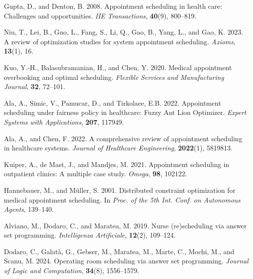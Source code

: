 \documentclass{tlp}
\begin{document}
\begin{thebibliography}{}

Gupta, D., and Denton, B. 2008.
Appointment scheduling in health care: Challenges and opportunities.
\textit{IIE Transactions}, \textbf{40}(9), 800--819.

Niu, T., Lei, B., Guo, L., Fang, S., Li, Q., Gao, B., Yang, L., and Gao, K. 2023.
A review of optimization studies for system appointment scheduling.
\textit{Axioms}, \textbf{13}(1), 16.

Kuo, Y.-H., Balasubramanian, H., and Chen, Y. 2020.
Medical appointment overbooking and optimal scheduling.
\textit{Flexible Services and Manufacturing Journal}, \textbf{32}, 72--101.

Ala, A., Simic, V., Pamucar, D., and Tirkolaee, E.B. 2022.
Appointment scheduling under fairness policy in healthcare: Fuzzy Ant Lion Optimizer.
\textit{Expert Systems with Applications}, \textbf{207}, 117949.

Ala, A., and Chen, F. 2022.
A comprehensive review of appointment scheduling in healthcare systems.
\textit{Journal of Healthcare Engineering}, \textbf{2022}(1), 5819813.

Kuiper, A., de Mast, J., and Mandjes, M. 2021.
Appointment scheduling in outpatient clinics: A multiple case study.
\textit{Omega}, \textbf{98}, 102122.

Hannebauer, M., and Müller, S. 2001.
Distributed constraint optimization for medical appointment scheduling.
In \textit{Proc. of the 5th Int. Conf. on Autonomous Agents}, 139--140.

Alviano, M., Dodaro, C., and Maratea, M. 2019.
Nurse (re)scheduling via answer set programming.
\textit{Intelligenza Artificiale}, \textbf{12}(2), 109--124.

Dodaro, C., Galatà, G., Gebser, M., Maratea, M., Marte, C., Mochi, M., and Scanu, M. 2024.
Operating room scheduling via answer set programming.
\textit{Journal of Logic and Computation}, \textbf{34}(8), 1556--1579.


\end{thebibliography}
\end{document}
